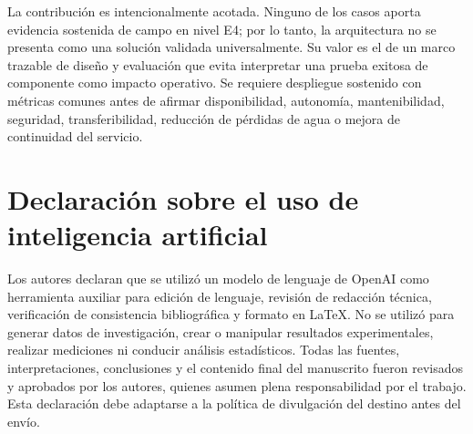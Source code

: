 \documentclass[conference]{IEEEtran}
\begin{document}
La contribución es intencionalmente acotada. Ninguno de los casos aporta evidencia sostenida de campo en nivel E4; por lo tanto, la arquitectura no se presenta como una solución validada universalmente. Su valor es el de un marco trazable de diseño y evaluación que evita interpretar una prueba exitosa de componente como impacto operativo. Se requiere despliegue sostenido con métricas comunes antes de afirmar disponibilidad, autonomía, mantenibilidad, seguridad, transferibilidad, reducción de pérdidas de agua o mejora de continuidad del servicio.

\section*{Declaración sobre el uso de inteligencia artificial}

Los autores declaran que se utilizó un modelo de lenguaje de OpenAI como herramienta auxiliar para edición de lenguaje, revisión de redacción técnica, verificación de consistencia bibliográfica y formato en LaTeX. No se utilizó para generar datos de investigación, crear o manipular resultados experimentales, realizar mediciones ni conducir análisis estadísticos. Todas las fuentes, interpretaciones, conclusiones y el contenido final del manuscrito fueron revisados y aprobados por los autores, quienes asumen plena responsabilidad por el trabajo. Esta declaración debe adaptarse a la política de divulgación del destino antes del envío.
\end{document}

